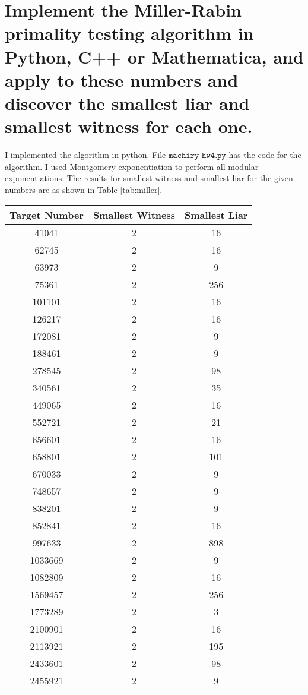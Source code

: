 \documentclass[11pt, pdftex]{article}
\begin{document}
\section{Implement the Miller-Rabin primality testing algorithm in Python, C++ or Mathematica, and apply to these numbers and discover the smallest liar and smallest witness for each one.}
I implemented the algorithm in python. File $\texttt{machiry\_hw4.py}$ has the code for the algorithm. I used Montgomery exponentiation to perform all modular exponentiations. The results for smallest witness and smallest liar for the given numbers are as shown in Table \ref{tab:miller}.
\begin{center}
\begin{tabular}{ |c|c|c| }
\hline
Target Number & Smallest Witness & Smallest Liar\\
\hline
41041 & 2 & 16\\
\hline
62745 & 2 & 16\\
\hline
63973 & 2 & 9\\
\hline
75361 & 2 & 256\\
\hline
101101 & 2 & 16\\
\hline
126217 & 2 & 16\\
\hline
172081 & 2 & 9\\
\hline
188461 & 2 & 9\\
\hline
278545 & 2 & 98\\
\hline
340561 & 2 & 35\\
\hline
449065 & 2 & 16\\
\hline
552721 & 2 & 21\\
\hline
656601 & 2 & 16\\
\hline
658801 & 2 & 101\\
\hline
670033 & 2 & 9\\
\hline
748657 & 2 & 9\\
\hline
838201 & 2 & 9\\
\hline
852841 & 2 & 16\\
\hline
997633 & 2 & 898\\
\hline
1033669 & 2 & 9\\
\hline
1082809 & 2 & 16\\
\hline
1569457 & 2 & 256\\
\hline
1773289 & 2 & 3\\
\hline
2100901 & 2 & 16\\
\hline
2113921 & 2 & 195\\
\hline
2433601 & 2 & 98\\
\hline
2455921 & 2 & 9\\
\hline
\end{tabular}
\label{tab:miller}
\end{center}
\end{document}
